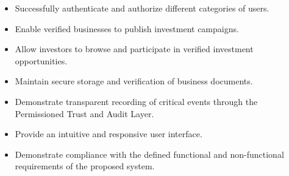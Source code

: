 \begin{itemize}

\item Successfully authenticate and authorize different categories of users.

\item Enable verified businesses to publish investment campaigns.

\item Allow investors to browse and participate in verified investment opportunities.

\item Maintain secure storage and verification of business documents.

\item Demonstrate transparent recording of critical events through the Permissioned Trust and Audit Layer.

\item Provide an intuitive and responsive user interface.

\item Demonstrate compliance with the defined functional and non-functional requirements of the proposed system.

\end{itemize}
